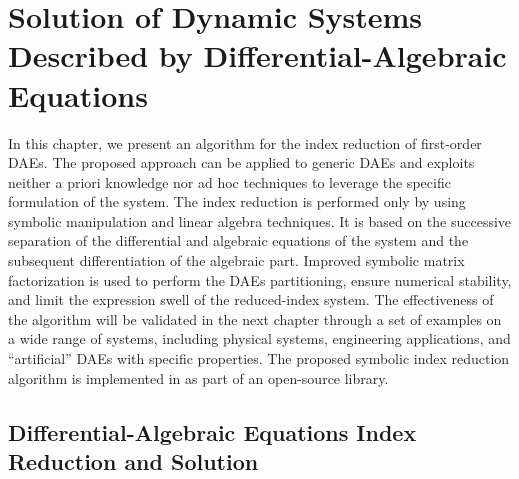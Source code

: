 
\chapter[Solution of Dynamic Systems Described by DAEs]{Solution of Dynamic Systems Described by Differential-Algebraic Equations}
\label{chap4:daes}

In this chapter, we present an algorithm for the index reduction of first-order \acp{DAE}. The proposed approach can be applied to generic \acp{DAE} and exploits neither a priori knowledge nor ad hoc techniques to leverage the specific formulation of the system. The index reduction is performed only by using symbolic manipulation and linear algebra techniques. It is based on the successive separation of the differential and algebraic equations of the system and the subsequent differentiation of the algebraic part. Improved symbolic matrix factorization is used to perform the \acp{DAE} partitioning, ensure numerical stability, and limit the expression swell of the reduced-index system. The effectiveness of the algorithm will be validated in the next chapter through a set of examples on a wide range of systems, including physical systems, engineering applications, and ``artificial'' \acp{DAE} with specific properties. The proposed symbolic index reduction algorithm is implemented in \Maple{} as part of an open-source library.


\section{Differential-Algebraic Equations Index Reduction and Solution}
\label{chap4:sec:introduction}

